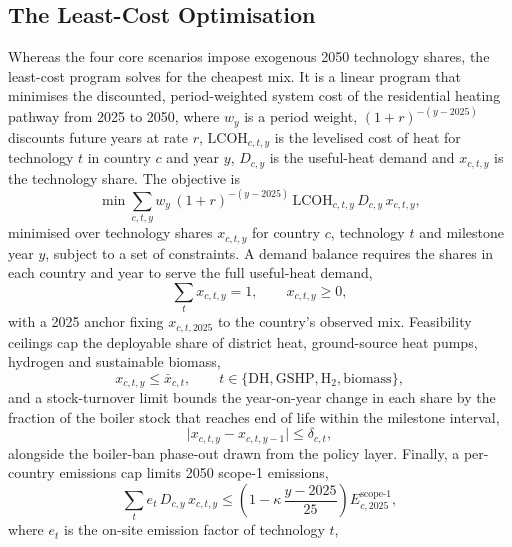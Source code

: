 \subsection{The Least-Cost Optimisation}
Whereas the four core scenarios impose exogenous 2050 technology shares,
the least-cost program solves for the cheapest mix. It is a linear program that
minimises the discounted, period-weighted system cost of the residential heating
pathway from 2025 to 2050, where $w_y$ is a period weight, $(1+r)^{-(y-2025)}$
discounts future years at rate $r$, $\mathrm{LCOH}_{c,t,y}$ is the levelised
cost of heat for technology $t$ in country $c$ and year $y$, $D_{c,y}$ is the
useful-heat demand and $x_{c,t,y}$ is the technology share. The objective is
\begin{equation}
\min \sum_{c,t,y} w_y\,(1+r)^{-(y-2025)}\,\mathrm{LCOH}_{c,t,y}\,D_{c,y}\,x_{c,t,y},
\label{eq:costopt_obj}
\end{equation}
minimised over technology shares $x_{c,t,y}$ for country $c$, technology $t$ and
milestone year $y$, subject to a set of constraints. A demand balance requires the shares
in each country and year to serve the full useful-heat demand,
\begin{equation}
\sum_{t} x_{c,t,y} = 1,\qquad x_{c,t,y}\ge 0,
\label{eq:costopt_demand}
\end{equation}
with a 2025 anchor fixing $x_{c,t,2025}$ to the country's observed mix. Feasibility
ceilings cap the deployable share of district heat, ground-source heat pumps,
hydrogen and sustainable biomass,
\begin{equation}
x_{c,t,y} \le \bar{x}_{c,t},\qquad t\in\{\text{DH},\text{GSHP},\text{H}_2,\text{biomass}\},
\label{eq:costopt_ceiling}
\end{equation}
and a stock-turnover limit bounds the year-on-year change in each share by the
fraction of the boiler stock that reaches end of life within the milestone interval,
\begin{equation}
\lvert x_{c,t,y}-x_{c,t,y-1}\rvert \le \delta_{c,t},
\label{eq:costopt_turnover}
\end{equation}
alongside the boiler-ban phase-out drawn from the policy layer. Finally, a
per-country emissions cap limits 2050 scope-1 emissions,
\begin{equation}
\sum_{t} e_{t}\,D_{c,y}\,x_{c,t,y}
\le \left(1-\kappa\,\frac{y-2025}{25}\right) E_{c,2025}^{\text{scope-1}},
\label{eq:costopt_cap}
\end{equation}
where $e_t$ is the on-site emission factor of technology $t$,
